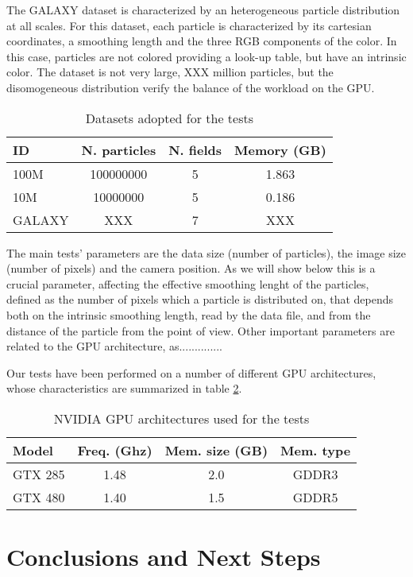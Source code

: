 \documentclass[11pt]{article}
\begin{document}
The GALAXY dataset is characterized by an heterogeneous particle distribution 
at all scales. For this dataset, each particle is characterized by its 
cartesian coordinates, a smoothing length and the three RGB components of the color. 
In this case, particles are not colored providing a look-up table,
but have an intrinsic color. The dataset is not very large, XXX million 
particles, but the disomogeneous distribution verify the balance 
of the workload on the GPU.

\begin{table}
\caption{Datasets adopted for the tests}
\centering 
\begin{tabular}{l c c c} 
\hline\hline 
ID & N. particles & N. fields & Memory (GB) \\ [0.5ex] 
\hline %
100M   & 100000000 & 5 & 1.863 \\ 
10M    & 10000000  & 5 & 0.186 \\
GALAXY & XXX & 7 & XXX \\
\hline 
\end{tabular}
\label{table:tests}
\end{table}

The main tests' parameters are the data size (number of particles),
the image size (number of pixels) and the camera position. As we will show below
this is a crucial parameter, affecting the effective smoothing lenght of the particles,
defined as the number of pixels which a particle is distributed on, that 
depends both on the intrinsic smoothing length, read by the data file, and 
from the distance of the particle from the point of view. Other important parameters
are related to the GPU architecture, as..............

Our tests have been performed on a number of different GPU architectures, 
whose characteristics are summarized in table \ref{table:gpus}. 

\begin{table}
\caption{NVIDIA GPU architectures used for the tests}
\centering
\begin{tabular}{l c c c}
\hline\hline
Model & Freq. (Ghz) & Mem. size (GB) & Mem. type \\ [0.5ex]
\hline %
GTX 285   & 1.48 & 2.0 & GDDR3 \\
GTX 480   & 1.40 & 1.5 & GDDR5 \\
\hline
\end{tabular}
\label{table:gpus}
\end{table}
 


\section{Conclusions and Next Steps}
\end{document}
